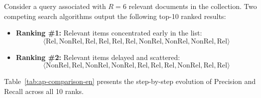 \begin{example}
Consider a query associated with $R = 6$ relevant documents in the collection. Two competing search algorithms output the following top-10 ranked results:
\begin{itemize}
    \item \textbf{Ranking \#1:} Relevant items concentrated early in the list:
    \[
    \langle \text{Rel}, \text{NonRel}, \text{Rel}, \text{Rel}, \text{Rel}, \text{Rel}, \text{NonRel}, \text{NonRel}, \text{NonRel}, \text{Rel} \rangle
    \]
    \item \textbf{Ranking \#2:} Relevant items delayed and scattered:
    \[
    \langle \text{NonRel}, \text{Rel}, \text{NonRel}, \text{NonRel}, \text{Rel}, \text{Rel}, \text{Rel}, \text{NonRel}, \text{Rel}, \text{Rel} \rangle
    \]
\end{itemize}
Table~\ref{tab:ap-comparison-en} presents the step-by-step evolution of Precision and Recall across all 10 ranks.

\begin{table}[H]
\centering
{}
\caption{Detailed comparative evaluation of Average Precision between Ranking \#1 and Ranking \#2.}
\label{tab:ap-comparison-en}
\end{table}


\end{example}
